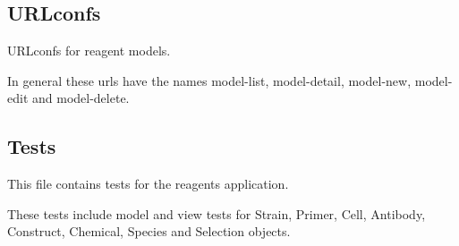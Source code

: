\documentclass[letterpaper,10pt,english]{sphinxmanual}
\begin{document}
\subsection{URLconfs}
\label{api:id21}\label{api:module-experimentdb.reagents.urls}
URLconfs for reagent models.

In general these urls have the names model-list, model-detail, model-new, model-edit and model-delete.


\subsection{Tests}
\label{api:id22}\label{api:module-experimentdb.reagents.tests}
This file contains tests for the reagents application.

These tests include model and view tests for Strain, Primer, Cell, Antibody, Construct, Chemical, Species and Selection objects.
\end{document}
